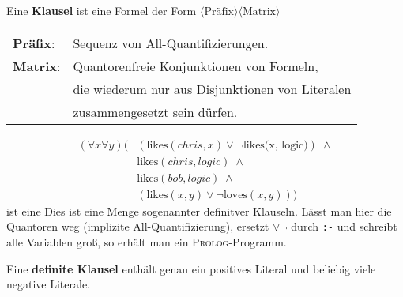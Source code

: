 \documentclass[runningheads,deutsch]{llncs}
\begin{document}
Eine \textbf{Klausel} ist eine Formel der Form $\langle\text{Präfix}\rangle\langle\text{Matrix}\rangle$


\begin{tabular}{l l}
    \textbf{Präfix}: & Sequenz von All-Quantifizierungen. \\
    \textbf{Matrix}: & Quantorenfreie Konjunktionen von Formeln, \\
                     &  die wiederum nur aus Disjunktionen von Literalen \\
                     & zusammengesetzt sein dürfen.    
\end{tabular}

\begin{example}
    \begin{align*}
        (\forall x\forall y)( &(\text{likes}(chris, x) \lor \lnot \text{likes(x, logic)})\; \land \\
        & \text{likes}(chris, logic)\; \land \\
        & \text{likes}(bob, logic)\; \land \\
        & (\text{likes}(x,y) \lor \lnot \text{loves}(x, y)))
    \end{align*} ist eine 
    Dies ist eine Menge sogenannter definitver Klauseln.
    Lässt man hier die Quantoren weg (implizite All-Quantifizierung), ersetzt $\lor\lnot$ durch \texttt{:-} und schreibt alle Variablen groß, so erhält man ein \textsc{Prolog}-Programm.
\end{example}

Eine \textbf{definite Klausel} enthält genau ein positives Literal und beliebig viele negative Literale.
\end{document}
